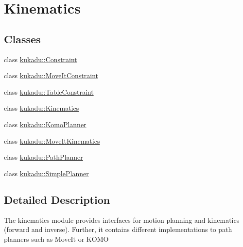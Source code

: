 \hypertarget{group__Kinematics}{\section{Kinematics}
\label{group__Kinematics}
}
\subsection*{Classes}
\begin{DoxyCompactItemize}
\item 
class \hyperlink{classkukadu_1_1Constraint}{kukadu\-::\-Constraint}
\item 
class \hyperlink{classkukadu_1_1MoveItConstraint}{kukadu\-::\-Move\-It\-Constraint}
\item 
class \hyperlink{classkukadu_1_1TableConstraint}{kukadu\-::\-Table\-Constraint}
\item 
class \hyperlink{classkukadu_1_1Kinematics}{kukadu\-::\-Kinematics}
\item 
class \hyperlink{classkukadu_1_1KomoPlanner}{kukadu\-::\-Komo\-Planner}
\item 
class \hyperlink{classkukadu_1_1MoveItKinematics}{kukadu\-::\-Move\-It\-Kinematics}
\item 
class \hyperlink{classkukadu_1_1PathPlanner}{kukadu\-::\-Path\-Planner}
\item 
class \hyperlink{classkukadu_1_1SimplePlanner}{kukadu\-::\-Simple\-Planner}
\end{DoxyCompactItemize}


\subsection{Detailed Description}
The kinematics module provides interfaces for motion planning and kinematics (forward and inverse). Further, it contains different implementations to path planners such as Move\-It or K\-O\-M\-O 